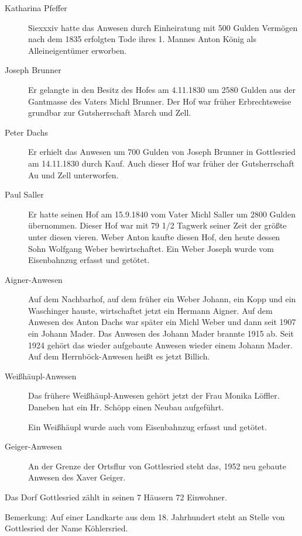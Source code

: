 \documentclass[12pt,a4pager,draft]{book}
\begin{document}
\begin{description}
\item[Katharina Pfeffer] Siexxxiv hatte das Anwesen durch Einheiratung mit 500
Gulden Vermögen nach dem 1835 erfolgten Tode ihres 1. Mannes Anton König als
Alleineigentümer erworben.

\item[Joseph Brunner] Er gelangte in den Besitz des Hofes am 4.11.1830 um 2580
Gulden aus der Gantmasse des Vaters Michl Brunner. Der Hof war früher
Erbrechtsweise grundbar zur Gutsherrschaft March und Zell.

\item[Peter Dachs] Er erhielt das Anwesen um 700 Gulden von Joseph Brunner in
Gottlesried am 14.11.1830 durch Kauf. Auch dieser Hof war früher der
Gutsherrschaft Au und Zell unterworfen.

\item[Paul Saller] Er hatte seinen Hof am 15.9.1840 vom Vater Michl Saller um
2800 Gulden übernommen. Dieser Hof war mit 79 1/2 Tagwerk seiner Zeit der größte
unter diesen vieren. Weber Anton kaufte diesen Hof, den heute dessen Sohn
Wolfgang Weber bewirtschaftet. Ein Weber Joseph wurde vom Eisenbahnzug erfasst
und getötet.

\item[Aigner-Anwesen] Auf dem Nachbarhof, auf dem früher ein Weber Johann, ein
Kopp und ein Waschinger hauste, wirtschaftet jetzt ein Hermann Aigner. Auf dem
Anwesen des Anton Dachs war später ein Michl Weber und dann seit 1907 ein Johann
Mader. Das Anwesen des Johann Mader brannte 1915 ab. Seit 1924 gehört das wieder
aufgebaute Anwesen wieder einem Johann Mader. Auf dem Herrnböck-Anwesen heißt es
jetzt Billich.

\item[Weißhäupl-Anwesen] Das frühere Weißhäupl-Anwesen gehört jetzt der Frau
Monika Löffler. Daneben hat ein Hr. Schöpp einen Neubau aufgeführt.

Ein Weißhäupl wurde auch vom Eisenbahnzug erfasst und getötet.

\item[Geiger-Anwesen] An der Grenze der Ortsflur von Gottlesried steht das,
1952 neu gebaute Anwesen des Xaver Geiger.
\end{description}

Das Dorf Gottlesried zählt in seinen 7 Häusern 72 Einwohner.

Bemerkung: Auf einer Landkarte aus dem 18. Jahrhundert steht an Stelle von
Gottlesried der Name Köhlersried.
\end{document}
